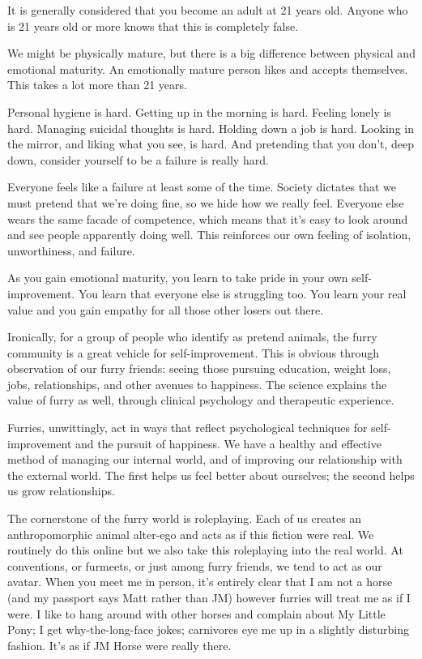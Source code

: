 
It is generally considered that you become an adult at 21 years old. Anyone who is 21 years old or more knows that this is completely false.

We might be physically mature, but there is a big difference between physical and emotional maturity. An emotionally mature person likes and accepts themselves. This takes a lot more than 21 years.

Personal hygiene is hard. Getting up in the morning is hard. Feeling lonely is hard. Managing suicidal thoughts is hard. Holding down a job is hard. Looking in the mirror, and liking what you see, is hard. And pretending that you don't, deep down, consider yourself to be a failure is really hard.

Everyone feels like a failure at least some of the time. Society dictates that we must pretend that we're doing fine, so we hide how we really feel. Everyone else wears the same facade of competence, which means that it's easy to look around and see people apparently doing well. This reinforces our own feeling of isolation, unworthiness, and failure.

As you gain emotional maturity, you learn to take pride in your own self-improvement. You learn that everyone else is struggling too. You learn your real value and you gain empathy for all those other losers out there.

Ironically, for a group of people who identify as pretend animals, the furry community is a great vehicle for self-improvement. This is obvious through observation of our furry friends: seeing those pursuing education, weight loss, jobs, relationships, and other avenues to happiness. The science explains the value of furry as well, through clinical psychology and therapeutic experience.

Furries, unwittingly, act in ways that reflect psychological techniques for self-improvement and the pursuit of happiness. We have a healthy and effective method of managing our internal world, and of improving our relationship with the external world. The first helps us feel better about ourselves; the second helps us grow relationships.

The cornerstone of the furry world is roleplaying. Each of us creates an anthropomorphic animal alter-ego and acts as if this fiction were real. We routinely do this online but we also take this roleplaying into the real world. At conventions, or furmeets, or just among furry friends, we tend to act as our avatar. When you meet me in person, it's entirely clear that I am not a horse (and my passport says Matt rather than JM) however furries will treat me as if I were. I like to hang around with other horses and complain about My Little Pony; I get why-the-long-face jokes; carnivores eye me up in a slightly disturbing fashion. It's as if JM Horse were really there.

